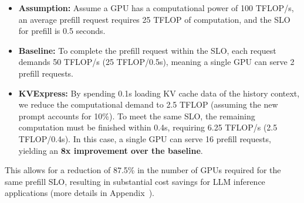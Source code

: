 \begin{itemize}
\item \textbf{Assumption:} Assume a GPU has a computational power of 100 TFLOP/s, an average prefill request requires 25 TFLOP of computation, and the SLO for prefill is 0.5 seconds.
\item \textbf{Baseline:} To complete the prefill request within the SLO, each request demands 50 TFLOP/s (25 TFLOP/0.5s), meaning a single GPU can serve 2 prefill requests. 
\item \textbf{KVExpress:} By spending 0.1s loading KV cache data of the history context, we reduce the computational demand to 2.5 TFLOP (assuming the new prompt accounts for 10\%). To meet the same SLO, the remaining computation must be finished within 0.4s, requiring 6.25 TFLOP/s (2.5 TFLOP/0.4s). In this case, a single GPU can serve 16 prefill requests, yielding an \textbf{8x improvement over the baseline}.
\end{itemize}





This allows for a reduction of 87.5\% in the number of GPUs required for the same prefill SLO, resulting in substantial cost savings for LLM inference applications (more details in Appendix~\cite{roi_model}).


